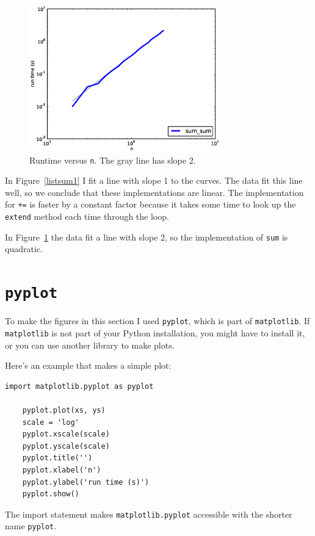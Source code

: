\documentclass[10pt]{book}
\begin{document}
\begin{figure}
\label{listsum2}
\centerline{\includegraphics[height=2.5in]{figs/listsum2.eps}}
\caption{Runtime versus {\tt n}.  The gray line has slope 2.}
\end{figure}

In Figure~\ref{listsum1} I fit a line with slope 1 to the curves.
The data fit this line well, so we conclude
that these implementations are linear.  The implementation for {\tt +=}
is faster by a constant factor because it takes some time
to look up the {\tt extend} method each time through the loop.

In Figure~\ref{listsum2} the data fit a line with slope 2, so the
implementation of {\tt sum} is quadratic.


\section{{\tt pyplot}}
\label{pyplot}

To make the figures in this section I used {\tt pyplot}, which is part of
{\tt matplotlib}.  If {\tt matplotlib} is not part of your Python
installation, you might have to install it, or you can use another
library to make plots.

Here's an example that makes a simple plot:

\begin{verbatim}
import matplotlib.pyplot as pyplot

    pyplot.plot(xs, ys)
    scale = 'log'
    pyplot.xscale(scale)
    pyplot.yscale(scale)
    pyplot.title('')
    pyplot.xlabel('n')
    pyplot.ylabel('run time (s)')
    pyplot.show()
\end{verbatim}

The import statement makes {\tt matplotlib.pyplot} accessible
with the shorter name {\tt pyplot}.
\end{document}
